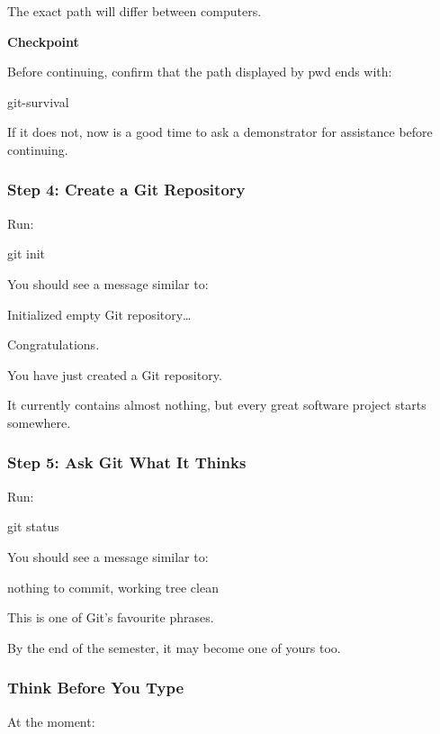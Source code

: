 \documentclass{csc2059practical}
\begin{document}
The exact path will differ between computers.

\begin{reflectionbox}
\textbf{Checkpoint}\par
\medskip

Before continuing, confirm that the path displayed by pwd ends with:


\end{reflectionbox}
\begin{terminalplain}
git-survival
\end{terminalplain}
If it does not, now is a good time to ask a demonstrator for assistance before continuing.

\subsubsection{Step 4: Create a Git Repository}
Run:

\begin{terminalplain}
git init
\end{terminalplain}
You should see a message similar to:

\begin{terminalplain}
Initialized empty Git repository\ldots{}
\end{terminalplain}
Congratulations.

You have just created a Git repository.

It currently contains almost nothing, but every great software project starts somewhere.

\subsubsection{Step 5: Ask Git What It Thinks}
Run:

\begin{terminalplain}
git status
\end{terminalplain}
You should see a message similar to:

\begin{terminalplain}
nothing to commit, working tree clean
\end{terminalplain}
This is one of Git's favourite phrases.

By the end of the semester, it may become one of yours too.

\subsubsection{Think Before You Type}
At the moment:
\end{document}
